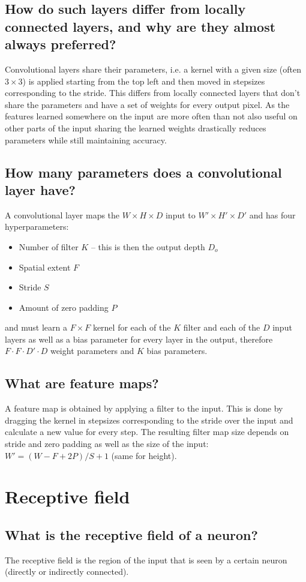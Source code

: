 \subsection{How do such layers differ from locally connected layers, and why are they almost always preferred?}
Convolutional layers share their parameters, i.e. a kernel with a given size (often $3\times 3$) is applied starting from the top left and then moved in stepsizes corresponding to the stride. 
This differs from locally connected layers that don't share the parameters and have a set of weights for every output pixel.  As the features learned somewhere on the input are more often than not also useful on other parts of the input sharing the learned weights drastically reduces parameters while still maintaining accuracy.
\subsection{How many parameters does a convolutional layer have?}
A convolutional layer maps the $W \times H \times D$ input to $W' \times H' \times D'$ and has four hyperparameters:
\begin{itemize}
\item Number of filter $K$ -- this is then the output depth $D_o$
\item Spatial extent $F$
\item Stride $S$
\item Amount of zero padding $P$
\end{itemize}
and must learn a $F\times F$ kernel for each of the $K$ filter and each of the $D$ input layers as well as a bias parameter for every layer in the output, therefore $F\cdot  F\cdot  D' \cdot  D$ weight parameters and $K$ bias parameters. 
\subsection{What are feature maps?}
A feature map is obtained by applying a filter to the input. This is done by dragging the kernel in stepsizes corresponding to the stride over the input and calculate a new value for every step. The resulting filter map size depends on stride and zero padding as well as the size of the input: $W' = (W-F+2P)/S +1$ (same for height).
%
\section{Receptive field}
\subsection{What is the receptive field of a neuron?}
The receptive field is the region of the input that is seen by a certain neuron (directly or indirectly connected).
